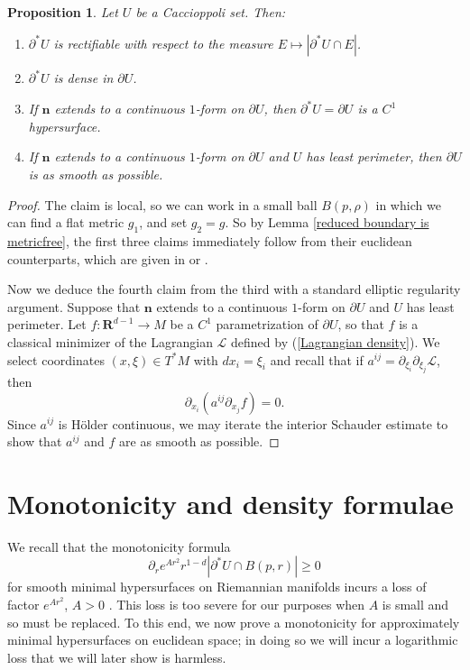 \documentclass[reqno,12pt,letterpaper]{amsart}
\newcommand{\RR}{\mathbf{R}}
\newcommand{\normal}{\mathbf n}
\newtheorem{proposition}[theorem]{Proposition}
\theoremstyle{definition}
\numberwithin{equation}{section}
\begin{document}
\begin{proposition}\label{regularity of reduced boundary}
Let $U$ be a Caccioppoli set.
Then:
\begin{enumerate}
\item $\partial^* U$ is rectifiable with respect to the measure $E \mapsto |\partial^* U \cap E|$.
\item $\partial^* U$ is dense in $\partial U$.
\item If $\normal$ extends to a continuous $1$-form on $\partial U$, then $\partial^* U = \partial U$ is a $C^1$ hypersurface.
\item If $\normal$ extends to a continuous $1$-form on $\partial U$ and $U$ has least perimeter, then $\partial U$ is as smooth as possible.
\end{enumerate}
\end{proposition}
\begin{proof}
The claim is local, so we can work in a small ball $B(p, \rho)$ in which we can find a flat metric $g_1$, and set $g_2 = g$.
So by Lemma \ref{reduced boundary is metricfree}, the first three claims immediately follow from their euclidean counterparts, which are given in \cite[Chapter 4]{Giusti77} or \cite{deGiorgi55}.

Now we deduce the fourth claim from the third with a standard elliptic regularity argument.
Suppose that $\normal$ extends to a continuous $1$-form on $\partial U$ and $U$ has least perimeter.
Let $f: \RR^{d - 1} \to M$ be a $C^1$ parametrization of $\partial U$, so that $f$ is a classical minimizer of the Lagrangian $\mathscr L$ defined by (\ref{Lagrangian density}).
We select coordinates $(x, \xi) \in T^* M$ with $dx_i = \xi_i$ and recall that if $a^{ij} = \partial_{\xi_i} \partial_{\xi_j}\mathscr L$, then
\begin{equation}\label{elliptic PDE}
\partial_{x_i} (a^{ij} \partial_{x_j} f) = 0.
\end{equation}
Since $a^{ij}$ is H\"older continuous, we may iterate the interior Schauder estimate \cite[Theorem 6.22]{gilbarg2015elliptic} to show that $a^{ij}$ and $f$ are as smooth as possible.
\end{proof}

\section{Monotonicity and density formulae}\label{inequalities}
We recall that the monotonicity formula
\begin{equation}\label{classic monotonicity formula}
\partial_r e^{Ar^2}r^{1 - d} |\partial^* U \cap B(p, r)| \geq 0
\end{equation}
for smooth minimal hypersurfaces on Riemannian manifolds incurs a loss of factor $e^{Ar^2}$, $A > 0$ \cite[\S7]{MarquesXX}.
This loss is too severe for our purposes when $A$ is small and so must be replaced.
To this end, we now prove a monotonicity for approximately minimal hypersurfaces on euclidean space; in doing so we will incur a logarithmic loss that we will later show is harmless.
\end{document}
